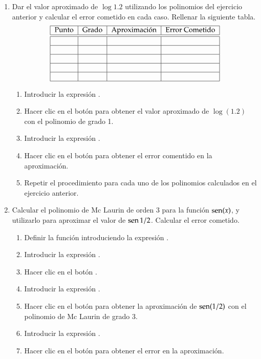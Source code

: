 \begin{enumerate}[leftmargin=*]
\item Dar el valor aproximado de $\log 1.2$ utilizando los polinomios del ejercicio anterior y calcular el error cometido en cada caso. 
Rellenar la siguiente tabla.
\[
\begin{tabular}{|c|c|c|c|}
\hline
Punto & Grado & Aproximación
& Error Cometido \\
\hline\hline
&  &  &  \\ \hline
&  &  &  \\ \hline
&  &  &  \\ \hline
&  &  &  \\ \hline
&  &  &  \\ \hline
\end{tabular}
\]

\begin{indicacion}
\begin{enumerate}
\item Introducir la expresión .
\item Hacer clic en el botón  para obtener el valor aproximado de $\log(1.2)$ con el polinomio de grado
1. 
\item Introducir la expresión .
\item Hacer clic en el botón  para obtener el error comentido en la aproximación.
\item Repetir el procedimiento para cada uno de los polinomios calculados en el ejercicio anterior. 
\end{enumerate}
\end{indicacion}

\item Calcular el polinomio de Mc Laurin de orden 3 para la función $\operatorname{sen}(x)$, y utilizarlo para aproximar el valor de
$\operatorname{sen} 1/2$.
Calcular el error cometido.

\begin{indicacion}
\begin{enumerate}
\item Definir la función introduciendo la expresión . 
\item Introducir la expresión .
\item Hacer clic en el botón .
\item Introducir la expresión .
\item Hacer clic en el botón  para obtener la aproximación de $\operatorname{sen}(1/2)$ con el polinomio de Mc Laurin
de grado 3.
\item Introducir la expresión .
\item Hacer clic en el botón  para obtener el error en la aproximación.
\end{enumerate}
\end{indicacion}


\end{enumerate}
